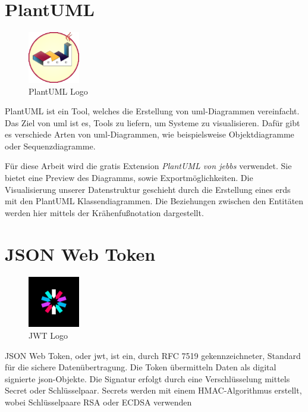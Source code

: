 \section{PlantUML}
\begin{figure}
  \begin{center}
      \includegraphics[width=0.2\textwidth]{pics/logos/plantuml.png}
      \caption{PlantUML Logo}
  \end{center}
\end{figure}
PlantUML ist ein Tool, welches die Erstellung von \gls{uml}-Diagrammen vereinfacht. 
Das Ziel von \gls{uml} ist es, Tools zu liefern, um Systeme zu visualisieren.
\cite{UMLPaper}
Dafür gibt es verschiede Arten von \gls{uml}-Diagrammen, wie beispielsweise Objektdiagramme oder Sequenzdiagramme.
\cite{PlantUML}

Für diese Arbeit wird die gratis Extension \emph{PlantUML von jebbs} verwendet. 
Sie bietet eine Preview des Diagramms, sowie Exportmöglichkeiten. 
\cite{PlantumlExtension}
Die Visualisierung unserer Datenstruktur geschieht durch die Erstellung eines \gls{erd}s mit den PlantUML Klassendiagrammen. 
Die Beziehungen zwischen den Entitäten werden hier mittels der Krähenfußnotation dargestellt.

\section{JSON Web Token}
\begin{figure}
  \begin{center}
      \includegraphics[width=0.2\textwidth]{pics/logos/jwt.png}
      \caption{JWT Logo}
  \end{center}
\end{figure}
JSON Web Token, oder \gls{jwt}, ist ein, durch RFC 7519 gekennzeichneter, Standard für die sichere Datenübertragung. 
Die Token übermitteln Daten als digital signierte \gls{json}-Objekte.
Die Signatur erfolgt durch eine Verschlüsselung mittels Secret oder Schlüsselpaar. 
Secrets werden mit einem HMAC-Algorithmus erstellt, wobei Schlüsselpaare RSA oder ECDSA verwenden
\cite{JWTAbout}

